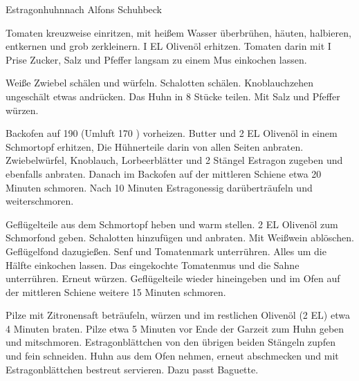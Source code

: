 \begin{recipe}{Estragonhuhn}{nach Alfons Schuhbeck}
  \label{Estragonhuhn}
  \inglist

  \steps
  Tomaten kreuzweise einritzen, mit heißem Wasser überbrühen, häuten,
  halbieren, entkernen und grob zerkleinern. I EL Olivenöl erhitzen. Tomaten
  darin mit I Prise Zucker, Salz und Pfeffer langsam zu einem Mus einkochen
  lassen.

  Weiße Zwiebel schälen und würfeln. Schalotten schälen.  Knoblauchzehen
  ungeschält etwas andrücken. Das Huhn in 8 Stücke teilen. Mit Salz und Pfeffer
  würzen.

  Backofen auf 190 \celsius (Umluft 170 \celsius) vorheizen. Butter und 2 EL
  Olivenöl in einem Schmortopf erhitzen, Die Hühnerteile darin von allen Seiten
  anbraten.  Zwiebelwürfel, Knoblauch, Lorbeerblätter und 2 Stängel Estragon
  zugeben und ebenfalls anbraten. Danach im Backofen auf der mittleren Schiene
  etwa 20 Minuten schmoren. Nach 10 Minuten Estragonessig darüberträufeln und
  weiterschmoren.

  Geflügelteile aus dem Schmortopf heben und warm stellen. 2 EL Olivenöl zum
  Schmorfond geben. Schalotten hinzufügen und anbraten. Mit Weißwein ablöschen.
  Geflügelfond dazugießen. Senf und Tomatenmark unterrühren. Alles um die
  Hälfte einkochen lassen. Das eingekochte Tomatenmus und die Sahne
  unterrühren. Erneut würzen. Geflügelteile wieder hineingeben und im Ofen auf
  der mittleren Schiene weitere 15 Minuten schmoren.

  Pilze mit Zitronensaft beträufeln, würzen und im restlichen Olivenöl (2 EL)
  etwa 4 Minuten braten.  Pilze etwa 5 Minuten vor Ende der Garzeit zum Huhn
  geben und mitschmoren.  Estragonblättchen von den übrigen beiden Stängeln
  zupfen und fein schneiden.  Huhn aus dem Ofen nehmen, erneut abschmecken und
  mit Estragonblättchen bestreut servieren. Dazu passt Baguette.

\end{recipe}
